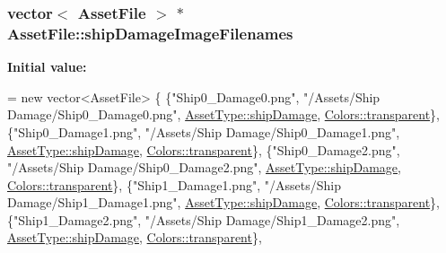 \hypertarget{struct_asset_file_a372beb61728cbc13001766c79ab1ee70}{
\subsubsection[{ship\-Damage\-Image\-Filenames}]{\setlength{\rightskip}{0pt plus 5cm}vector$<$ {\bf Asset\-File} $>$ $\ast$ Asset\-File\-::ship\-Damage\-Image\-Filenames\hspace{0.3cm}{\ttfamily [static]}}}\label{struct_asset_file_a372beb61728cbc13001766c79ab1ee70}
{\bfseries Initial value\-:}
\begin{DoxyCode}
= \textcolor{keyword}{new} vector<AssetFile> \{
    \{\textcolor{stringliteral}{"Ship0\_Damage0.png"}, \textcolor{stringliteral}{"/Assets/Ship Damage/Ship0\_Damage0.png"}, 
      \hyperlink{_asset_file_i_o_8h_a72d924d1cb8e1544b6d5198e98d52ca9a6ea4f9678cf690cec660433e498121df}{AssetType::shipDamage}, \hyperlink{_character_data_8h_a55ecd4f2ec2ebfe8d5b0163e4ac2a967a5e96bf62b9b2c18fdb65564b4a18fd1f}{Colors::transparent}\},
    \{\textcolor{stringliteral}{"Ship0\_Damage1.png"}, \textcolor{stringliteral}{"/Assets/Ship Damage/Ship0\_Damage1.png"}, 
      \hyperlink{_asset_file_i_o_8h_a72d924d1cb8e1544b6d5198e98d52ca9a6ea4f9678cf690cec660433e498121df}{AssetType::shipDamage}, \hyperlink{_character_data_8h_a55ecd4f2ec2ebfe8d5b0163e4ac2a967a5e96bf62b9b2c18fdb65564b4a18fd1f}{Colors::transparent}\},
    \{\textcolor{stringliteral}{"Ship0\_Damage2.png"}, \textcolor{stringliteral}{"/Assets/Ship Damage/Ship0\_Damage2.png"}, 
      \hyperlink{_asset_file_i_o_8h_a72d924d1cb8e1544b6d5198e98d52ca9a6ea4f9678cf690cec660433e498121df}{AssetType::shipDamage}, \hyperlink{_character_data_8h_a55ecd4f2ec2ebfe8d5b0163e4ac2a967a5e96bf62b9b2c18fdb65564b4a18fd1f}{Colors::transparent}\},
    \{\textcolor{stringliteral}{"Ship1\_Damage1.png"}, \textcolor{stringliteral}{"/Assets/Ship Damage/Ship1\_Damage1.png"}, 
      \hyperlink{_asset_file_i_o_8h_a72d924d1cb8e1544b6d5198e98d52ca9a6ea4f9678cf690cec660433e498121df}{AssetType::shipDamage}, \hyperlink{_character_data_8h_a55ecd4f2ec2ebfe8d5b0163e4ac2a967a5e96bf62b9b2c18fdb65564b4a18fd1f}{Colors::transparent}\},
    \{\textcolor{stringliteral}{"Ship1\_Damage2.png"}, \textcolor{stringliteral}{"/Assets/Ship Damage/Ship1\_Damage2.png"}, 
      \hyperlink{_asset_file_i_o_8h_a72d924d1cb8e1544b6d5198e98d52ca9a6ea4f9678cf690cec660433e498121df}{AssetType::shipDamage}, \hyperlink{_character_data_8h_a55ecd4f2ec2ebfe8d5b0163e4ac2a967a5e96bf62b9b2c18fdb65564b4a18fd1f}{Colors::transparent}\},

\end{DoxyCode}

